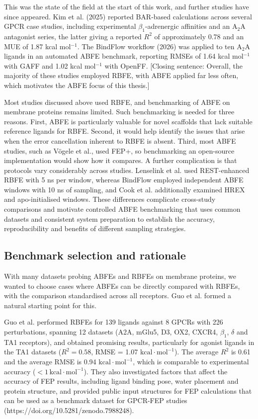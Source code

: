 This was the state of the field at the start of this work, and further studies have since appeared. Kim et al. (2025) reported BAR-based calculations across several GPCR case studies, including experimental $\beta_1$-adrenergic affinities and an A$_2$A antagonist series, the latter giving a reported $R^2$ of approximately 0.78 and an MUE of 1.87 kcal mol$^{-1}$. The BindFlow workflow (2026) was applied to ten A$_2$A ligands in an automated ABFE benchmark, reporting RMSEs of 1.64 kcal mol$^{-1}$ with GAFF and 1.02 kcal mol$^{-1}$ with OpenFF. [Closing sentence: Overall, the majority of these studies employed RBFE, with ABFE applied far less often, which motivates the ABFE focus of this thesis.]

Most studies discussed above used RBFE, and benchmarking of ABFE on membrane proteins remains limited. Such benchmarking is needed for three reasons. First, ABFE is particularly valuable for novel scaffolds that lack suitable reference ligands for RBFE. Second, it would help identify the issues that arise when the error cancellation inherent to RBFE is absent. Third, most ABFE studies, such as Vögele et al., used FEP+, so benchmarking an open-source implementation would show how it compares. A further complication is that protocols vary considerably across studies. Lenselink et al. used REST-enhanced RBFE with 5 ns per window, whereas BindFlow employed independent ABFE windows with 10 ns of sampling, and Cook et al. additionally examined HREX and apo-initialised windows. These differences complicate cross-study comparisons and motivate controlled ABFE benchmarking that uses common datasets and consistent system preparation to establish the accuracy, reproducibility and benefits of different sampling strategies.


\subsection{Benchmark selection and rationale}

With many datasets probing ABFEs and RBFEs on membrane proteins, we wanted to choose cases where ABFEs can be directly compared with RBFEs, with the comparison standardised across all receptors. Guo et al. formed a natural starting point for this.

Guo et al. performed RBFEs for 139 ligands against 8 GPCRs with 226 perturbations, spanning 12 datasets (A2A, mGlu5, D3, OX2, CXCR4, $\beta_1$, $\delta$ and TA1 receptors), and obtained promising results, particularly for agonist ligands in the TA1 datasets ($R^2 = 0.58$, RMSE = 1.07 $\mathrm{kcal} \cdot \mathrm{mol}^{-1}$). The average $R^2$ is 0.61 and the average RMSE is 0.94 $\mathrm{kcal} \cdot \mathrm{mol}^{-1}$, which is comparable to experimental accuracy ($<1\,\mathrm{kcal} \cdot \mathrm{mol}^{-1}$). They also investigated factors that affect the accuracy of FEP results, including ligand binding pose, water placement and protein structure, and provided public input structures for FEP calculations that can be used as a benchmark dataset for GPCR-FEP studies (https://doi.org/10.5281/zenodo.7988248).


